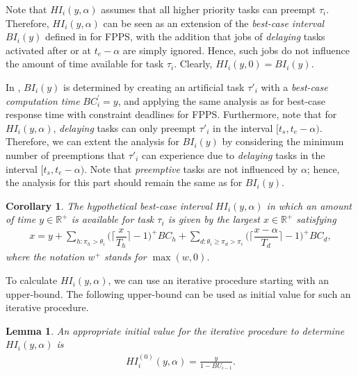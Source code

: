 \documentclass[fleqn]{article}
\newtheorem{corollary}{Corollary}
\newtheorem{lemma}{Lemma}
\begin{document}
Note that $HI_i(y,\alpha)$ assumes that all higher priority tasks can preempt $\tau_i$. Therefore, $HI_i(y,\alpha)$ can be seen as an extension of the \textit{best-case interval} $BI_i(y)$ defined in \cite{BLM13} for FPPS, with the addition that jobs of \textit{delaying} tasks activated after or at $t_e-\alpha$ are simply ignored. Hence, such jobs do not influence the amount of time available for task $\tau_i$.  Clearly, $HI_i(y,0) = BI_i(y)$.

In \cite{BLM13}, $BI_i(y)$ is determined by creating an artificial task $\tau'_i$ with a \textit{best-case computation time} $BC^{\prime}_i = y$, and applying the same analysis as for best-case response time with constraint deadlines for FPPS. Furthermore, note that for $HI_i(y,\alpha)$, \textit{delaying} tasks can only preempt $\tau'_i$ in the interval $[t_s,t_e-\alpha)$. Therefore, we can extent the analysis for $BI_i(y)$ by considering the minimum number of preemptions that $\tau'_i$ can experience due to \textit{delaying} tasks in the interval $[t_s,t_e-\alpha)$. Note that \textit{preemptive} tasks are not influenced by $\alpha$; hence, the analysis for this part should remain the same as for $BI_i(y)$.


\begin{corollary}
	The \textit{hypothetical best-case interval} $HI_i(y, \alpha)$ in which an amount of time $y\in \mathbb{R^+}$ is available for task $\tau_i$ is given by the largest $x \in \mathbb{R}^+$ satisfying
	\begin{align}
	x = y + \sum\limits_{h:\pi_h > \theta_i} \Big( \Big\lceil  \dfrac{x}{T_h}\Big\rceil -1 \Big)^+  BC_h + \sum\limits_{d:\theta_i \geq \pi_d > \pi_i} \Big( \Big\lceil  \dfrac{x-\alpha}{T_d}\Big\rceil -1 \Big)^+  BC_d,
	\end{align}
	where the notation $w^+$ stands for $\max(w,0)$.
\end{corollary}

To calculate $HI_i(y, \alpha)$, we can use an iterative procedure starting with an upper-bound. The following upper-bound can be used as initial value for such an iterative procedure.

\begin{lemma}
	An appropriate initial value for the iterative procedure to determine $HI_i(y,\alpha)$ is
	\begin{align}
	HI_i^{(0)}(y,\alpha) = \frac{y}{1-BU_{i-1}}.
	\end{align}
\end{lemma}
\end{document}
